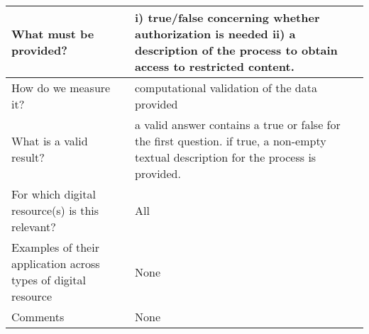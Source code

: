 \documentclass[english]{article}
\begin{document}
\begin{longtable}{|p{5cm}|p{9cm}|}
\\



\hline
What must be provided? &  


i) true/false concerning whether authorization is needed\newline 
ii) a description of the process to obtain access to restricted content.\newline 




\\



\hline
How do we measure it? &  


computational validation of the data provided




\\



\hline
What is a valid result? &  



a valid answer contains a true or false for the first question. if true, a non-empty textual description for the process is provided.


\\



\hline
For which digital resource(s) is this relevant? &  All\\



\hline
Examples of their application across types of digital resource &  None

\\



\hline

Comments & None 

\\
\hline

\end{longtable}
\end{document}
